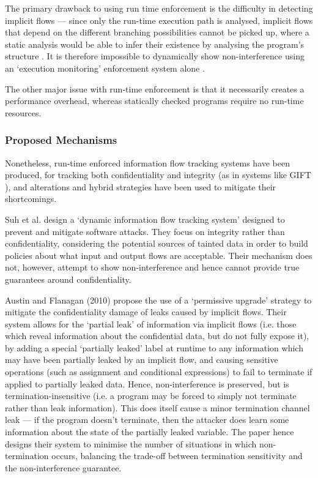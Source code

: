 The primary drawback to using run time enforcement is the difficulty in detecting implicit flows \cite{sabelfeld2003if} --- since only the run-time execution path is analysed, implicit flows that depend on the different branching possibilities cannot be picked up, where a static analysis would be able to infer their existence by analysing the program's structure \cite{venkatakrishnan2006runtime}. It is therefore impossible to dynamically show non-interference using an `execution monitoring' enforcement system alone \cite{schneider2000executionmonitoring}.

The other major issue with run-time enforcement is that it necessarily creates a performance overhead, whereas statically checked programs require no run-time resources.

\subsubsection{Proposed Mechanisms}

Nonetheless, run-time enforced information flow tracking systems have been produced, for tracking both confidentiality and integrity (as in systems like GIFT \cite{lam2006dynamicintegrity}), and alterations and hybrid strategies have been used to mitigate their shortcomings.

Suh et al. \cite{suh2004dynamicintegrity} design a `dynamic information flow tracking system' designed to prevent and mitigate software attacks. They focus on integrity rather than confidentiality, considering the potential sources of tainted data in order to build policies about what input and output flows are acceptable. Their mechanism does not, however, attempt to show non-interference and hence cannot provide true guarantees around confidentiality.

Austin and Flanagan (2010) \cite{austin2010runtime} propose the use of a `permissive upgrade' strategy to mitigate the confidentiality damage of leaks caused by implicit flows. Their system allows for the `partial leak' of information via implicit flows (i.e. those which reveal information about the confidential data, but do not fully expose it), by adding a special `partially leaked' label at runtime to any information which may have been partially leaked by an implicit flow, and causing sensitive operations (such as assignment and conditional expressions) to fail to terminate if applied to partially leaked data. Hence, non-interference is preserved, but is termination-insensitive (i.e. a program may be forced to simply not terminate rather than leak information). This does itself cause a minor termination channel leak --- if the program doesn't terminate, then the attacker does learn some information about the state of the partially leaked variable. The paper hence designs their system to minimise the number of situations in which non-termination occurs, balancing the trade-off between termination sensitivity and the non-interference guarantee.


